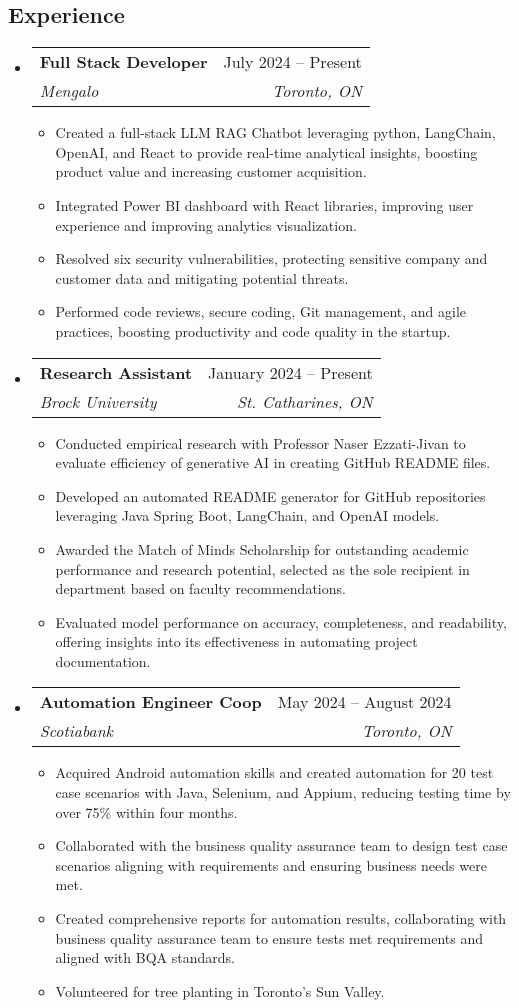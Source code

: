 \documentclass[letterpaper,11pt]{article}
\makeatletter
\newcommand{\resumeItem}[1]{
  \item\small{
    {#1 \vspace{-2pt}}
  }
}
\newcommand{\resumeSubheading}[4]{
  \vspace{-2pt}\item
    \begin{tabular*}{0.97\textwidth}[t]{l@{\extracolsep{\fill}}r}
      \textbf{#1} & #2 \\
      \textit{\small#3} & \textit{\small #4} \\
    \end{tabular*}\vspace{-7pt}
}
\newcommand{\resumeSubHeadingListStart}{\begin{itemize}[leftmargin=0.15in, label={}]}
\newcommand{\resumeSubHeadingListEnd}{\end{itemize}}
\newcommand{\resumeItemListStart}{\begin{itemize}}
\newcommand{\resumeItemListEnd}{\end{itemize}\vspace{-5pt}}
\makeatother
\begin{document}
 \begin{center}

\section{Experience}

 \resumeSubHeadingListStart
    \resumeSubheading
    {Full Stack Developer  }{July 2024 -- Present}
    {Mengalo}{Toronto, ON}
      \resumeItemListStart
        \resumeItem{Created a full-stack LLM RAG Chatbot leveraging python, LangChain, OpenAI, and React to provide real-time analytical insights, boosting product value and increasing customer acquisition.}
        \resumeItem{Integrated Power BI dashboard with React libraries, improving user experience and improving analytics visualization.}
        \resumeItem{Resolved six security vulnerabilities, protecting sensitive company and customer data and mitigating potential threats.}
        \resumeItem{Performed code reviews, secure coding, Git management, and agile practices, boosting productivity and code quality in the startup.}
    \resumeItemListEnd
\resumeSubHeadingListEnd

\resumeSubHeadingListStart
    \resumeSubheading
    {Research Assistant}{January 2024 -- Present}
    {Brock University}{St. Catharines, ON}
      \resumeItemListStart
        \resumeItem{Conducted empirical research with Professor Naser Ezzati-Jivan to evaluate efficiency of generative AI in creating GitHub README files.}
        \resumeItem {Developed an automated README generator for GitHub repositories leveraging Java Spring Boot, LangChain, and OpenAI models.}
        \resumeItem{Awarded the Match of Minds Scholarship for outstanding academic performance and research potential, selected as the sole recipient in department based on faculty recommendations.}
        \resumeItem{Evaluated model performance on accuracy, completeness, and readability, offering insights into its effectiveness in automating project documentation.}
    \resumeItemListEnd
\resumeSubHeadingListEnd

  \resumeSubHeadingListStart
    \resumeSubheading
    {Automation Engineer Coop}{May 2024 -- August 2024}
    {Scotiabank}{Toronto, ON}
      \resumeItemListStart
        \resumeItem{Acquired Android automation skills and created automation for 20 test case scenarios with Java, Selenium, and Appium, reducing testing time by over 75\% within four months.}
        \resumeItem{Collaborated with the business quality assurance team to design test case scenarios aligning with requirements and ensuring business needs were met.}
        \resumeItem{Created comprehensive reports for automation results, collaborating with business quality assurance team to ensure tests met requirements and aligned with BQA standards.}
        \resumeItem{Volunteered for tree planting in Toronto's Sun Valley.}
    \resumeItemListEnd
\resumeSubHeadingListEnd


\end{center}
\end{document}

